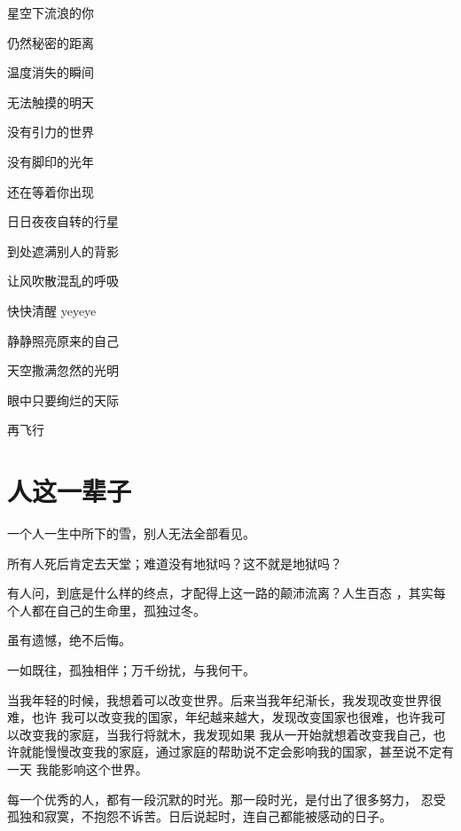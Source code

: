 \documentclass[UTF8,oneside]{ctexbook}
\begin{document}
\quad \quad \quad \quad \quad 星空下流浪的你

\quad \quad \quad \quad \quad 仍然秘密的距离

\quad \quad \quad \quad \quad 温度消失的瞬间

\quad \quad \quad \quad \quad 无法触摸的明天

\quad \quad \quad \quad \quad 没有引力的世界

\quad \quad \quad \quad \quad 没有脚印的光年

\quad \quad \quad \quad \quad 还在等着你出现

\quad \quad \quad \quad \quad 日日夜夜自转的行星

\quad \quad \quad \quad \quad 到处遮满别人的背影

\quad \quad \quad \quad \quad 让风吹散混乱的呼吸

\quad \quad \quad \quad \quad 快快清醒 yeyeye

\quad \quad \quad \quad \quad 静静照亮原来的自己

\quad \quad \quad \quad \quad 天空撒满忽然的光明

\quad \quad \quad \quad \quad 眼中只要绚烂的天际

\quad \quad \quad \quad \quad 再飞行

\section{人这一辈子}
\mfApache \quad 一个人一生中所下的雪，别人无法全部看见。

\mfApache \quad 所有人死后肯定去天堂；难道没有地狱吗？这不就是地狱吗？

\mfApache \quad 有人问，到底是什么样的终点，才配得上这一路的颠沛流离？人生百态
，其实每个人都在自己的生命里，孤独过冬。

\mfApache \quad 虽有遗憾，绝不后悔。

\mfApache \quad 一如既往，孤独相伴；万千纷扰，与我何干。

\mfApache \quad 当我年轻的时候，我想着可以改变世界。后来当我年纪渐长，我发现改变世界很难，也许
我可以改变我的国家，年纪越来越大，发现改变国家也很难，也许我可以改变我的家庭，当我行将就木，我发现如果
我从一开始就想着改变我自己，也许就能慢慢改变我的家庭，通过家庭的帮助说不定会影响我的国家，甚至说不定有一天
我能影响这个世界。

\mfApache \quad 每一个优秀的人，都有一段沉默的时光。那一段时光，是付出了很多努力，
忍受孤独和寂寞，不抱怨不诉苦。日后说起时，连自己都能被感动的日子。
\end{document}
